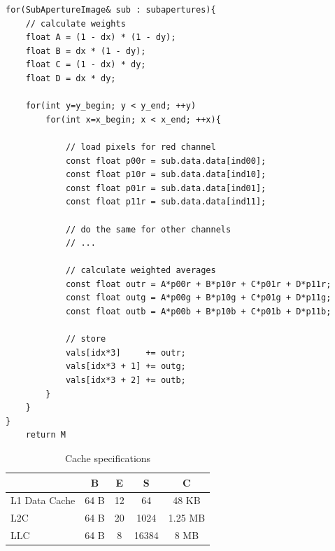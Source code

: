 \documentclass[letterpaper]{article}
\begin{document}
\begin{verbatim}
for(SubApertureImage& sub : subapertures){
    // calculate weights
    float A = (1 - dx) * (1 - dy);
    float B = dx * (1 - dy);
    float C = (1 - dx) * dy;
    float D = dx * dy;

    for(int y=y_begin; y < y_end; ++y)
        for(int x=x_begin; x < x_end; ++x){

            // load pixels for red channel
            const float p00r = sub.data.data[ind00];
            const float p10r = sub.data.data[ind10];
            const float p01r = sub.data.data[ind01];
            const float p11r = sub.data.data[ind11];

            // do the same for other channels
            // ...

            // calculate weighted averages
            const float outr = A*p00r + B*p10r + C*p01r + D*p11r;
            const float outg = A*p00g + B*p10g + C*p01g + D*p11g;
            const float outb = A*p00b + B*p10b + C*p01b + D*p11b;

            // store
            vals[idx*3]     += outr;
            vals[idx*3 + 1] += outg;
            vals[idx*3 + 2] += outb;
        }
    }
}
    return M
\end{verbatim}


\begin{table}[H]
\centering
\begin{tabular}{|l|c|c|c|c|}
\hline
               & B    & E & S     & C       \\ \hline
L1 Data Cache  & 64 B & 12  & 64    & 48 KB   \\ \hline
L2C            & 64 B & 20  & 1024  & 1.25 MB \\ \hline
LLC            & 64 B & 8   & 16384 & 8 MB    \\ \hline
\end{tabular}
\caption{Cache specifications}
\label{tab:cache_specs}
\end{table}
\end{document}
